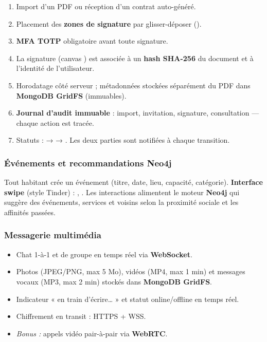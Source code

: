 \documentclass[12pt,a4paper]{article}
\begin{document}
\begin{enumerate}
    \item Import d'un PDF ou réception d'un contrat auto-généré.
    \item Placement des \textbf{zones de signature} par glisser-déposer
          ().
    \item \textbf{MFA TOTP} obligatoire avant toute signature.
    \item La signature (canvas ) est associée à un
          \textbf{hash SHA-256} du document et à l'identité de l'utilisateur.
    \item Horodatage côté serveur ; métadonnées stockées séparément du PDF dans
          \textbf{MongoDB GridFS} (immuables).
    \item \textbf{Journal d'audit immuable} : import, invitation, signature,
          consultation — chaque action est tracée.
    \item Statuts :  →  → .
          Les deux parties sont notifiées à chaque transition.
\end{enumerate}

\subsubsection{Événements et recommandations Neo4j}

Tout habitant crée un événement (titre, date, lieu, capacité, catégorie).
\textbf{Interface swipe} (style Tinder) : , .
Les interactions alimentent le moteur \textbf{Neo4j} qui suggère des événements,
services et voisins selon la proximité sociale et les affinités passées.

\subsubsection{Messagerie multimédia}

\begin{itemize}
    \item Chat 1-à-1 et de groupe en temps réel via \textbf{WebSocket}.
    \item Photos (JPEG/PNG, max 5 Mo), vidéos (MP4, max 1 min) et messages vocaux
          (MP3, max 2 min) stockés dans \textbf{MongoDB GridFS}.
    \item Indicateur « en train d'écrire… » et statut online/offline en temps réel.
    \item Chiffrement en transit : HTTPS + WSS.
    \item \textit{Bonus :} appels vidéo pair-à-pair via \textbf{WebRTC}.
\end{itemize}
\end{document}
